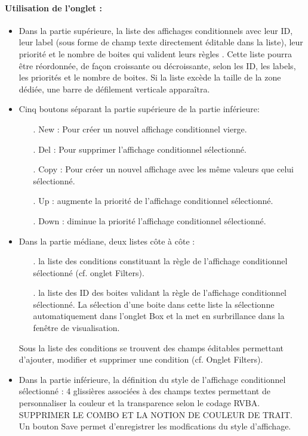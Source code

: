 \documentclass[a4paper]{article}
\begin{document}
\paragraph{Utilisation de l'onglet :}
\begin{itemize}
\item Dans la partie supérieure, la liste des affichages conditionnels avec leur ID, leur label (sous forme de champ texte directement éditable dans la liste), leur priorité \danger et le nombre de boites qui valident leurs règles \danger. Cette liste pourra être réordonnée, de façon croissante ou décroissante, selon les ID, les labels, les priorités et le nombre de boites. Si la liste excède la taille de la zone dédiée, une barre de défilement verticale apparaîtra.
\item Cinq boutons séparant la partie supérieure de la partie inférieure:
  \begin{itemize}
  \item[.] New : Pour créer un nouvel affichage conditionnel vierge.
  \item[.] Del : Pour supprimer l'affichage conditionnel sélectionné.
  \item[.] Copy : Pour créer un nouvel affichage avec les même valeurs que celui sélectionné.
  \item[.] Up : augmente la priorité de l'affichage conditionnel sélectionné.
  \item[.] Down : diminue la priorité l'affichage conditionnel sélectionné.
  \end{itemize}
\item Dans la partie médiane, deux listes côte à côte :
  \begin{itemize}
  \item[.] la liste des conditions constituant la règle de l'affichage conditionnel sélectionné (cf. onglet Filters).
  \item[.] la liste des ID des boites validant la règle de l'affichage conditionnel sélectionné. La sélection d'une boite dans cette liste la sélectionne automatiquement dans l'onglet Box et la met en surbrillance dans la fenêtre de visualisation.
  \end{itemize}
  Sous la liste des conditions se trouvent des champs éditables permettant d'ajouter, modifier et supprimer une condition (cf. Onglet Filters).\danger
\item Dans la partie inférieure, la définition du style de l'affichage conditionnel sélectionné : 4 glissières associées à des champs textes permettant de personnaliser la couleur et la transparence selon le codage RVBA.\\ SUPPRIMER LE COMBO ET LA NOTION DE COULEUR DE TRAIT.\\Un bouton Save permet d'enregistrer les modfications du style d'affichage.
\end{itemize}
\end{document}
